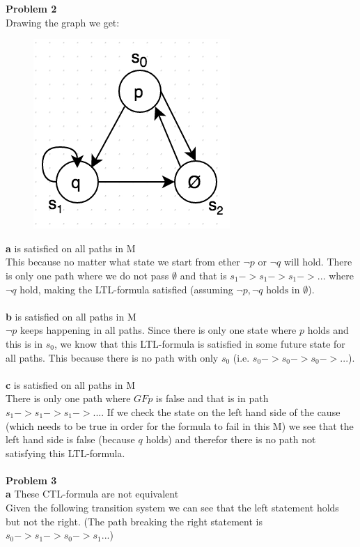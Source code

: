 \documentclass[12pt,oneside,reqno]{amsart}
\begin{document}
\textbf{Problem 2}\\
Drawing the graph we get: 
	\begin{figure}[h]
      	\includegraphics[scale=0.5]{prob2}
	\end{figure}
\textbf{a} is satisfied on all paths in M\\
This because no matter what state we start from ether $\neg p$ or $\neg q$ will hold. There is only one path where we do not pass $\emptyset$ and that is $s_1 ->s_1->s_1 ->...$ where $\neg q$ hold, making the LTL-formula satisfied (assuming $\neg p, \neg q \text{ holds in } \emptyset$).\\\\
\textbf{b} is satisfied on all paths in M\\
$\neg p$ keeps happening in all paths. Since there is only one state where $p$ holds and this is in $s_0$, we know that this LTL-formula is satisfied in some future state for all paths. This because there is no path with only $s_0$ (i.e. $s_0->s_0->s_0->...$).\\\\
\textbf{c} is satisfied on all paths in M\\
There is only one path where $GFp$ is false and that is in path $s_1->s_1->s_1->...$. If we check the state on the left hand side of the cause (which needs to be true in order for the formula to fail in this M) we see that the left hand side is false (because $q$ holds) and therefor there is no path not satisfying this LTL-formula.\\\\
\textbf{Problem 3}\\
\textbf{a} These CTL-formula are not equivalent\\
Given the following transition system we can see that the left statement holds but not the right. (The path breaking the right statement is $s_0->s_1->s_0->s_1...$)
\end{document}
